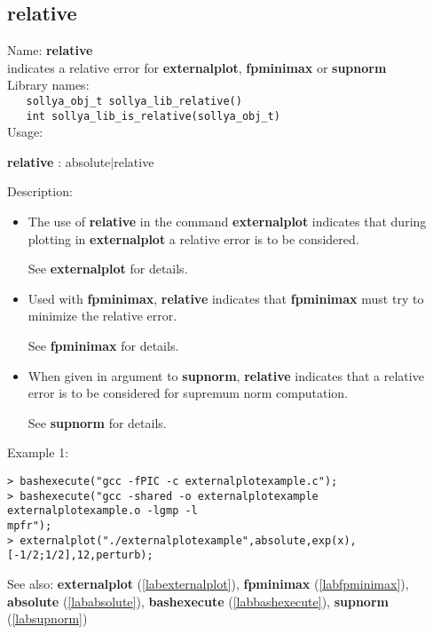 \subsection{relative}
\label{labrelative}
\noindent Name: \textbf{relative}\\
\phantom{aaa}indicates a relative error for \textbf{externalplot}, \textbf{fpminimax} or \textbf{supnorm}\\[0.2cm]
\noindent Library names:\\
\verb|   sollya_obj_t sollya_lib_relative()|\\
\verb|   int sollya_lib_is_relative(sollya_obj_t)|\\[0.2cm]
\noindent Usage: 
\begin{center}
\textbf{relative} : \textsf{absolute$|$relative}\\
\end{center}
\noindent Description: \begin{itemize}

\item The use of \textbf{relative} in the command \textbf{externalplot} indicates that during
   plotting in \textbf{externalplot} a relative error is to be considered.
    
   See \textbf{externalplot} for details.

\item Used with \textbf{fpminimax}, \textbf{relative} indicates that \textbf{fpminimax} must try to minimize
   the relative error.
    
   See \textbf{fpminimax} for details.

\item When given in argument to \textbf{supnorm}, \textbf{relative} indicates that a relative error
   is to be considered for supremum norm computation.
    
   See \textbf{supnorm} for details.
\end{itemize}
\noindent Example 1: 
\begin{center}\begin{minipage}{15cm}\begin{Verbatim}[frame=single,commandchars=\\\|\~]
> bashexecute("gcc -fPIC -c externalplotexample.c");
> bashexecute("gcc -shared -o externalplotexample externalplotexample.o -lgmp -l
mpfr");
> externalplot("./externalplotexample",absolute,exp(x),[-1/2;1/2],12,perturb);
\end{Verbatim}
\end{minipage}\end{center}
See also: \textbf{externalplot} (\ref{labexternalplot}), \textbf{fpminimax} (\ref{labfpminimax}), \textbf{absolute} (\ref{lababsolute}), \textbf{bashexecute} (\ref{labbashexecute}), \textbf{supnorm} (\ref{labsupnorm})
